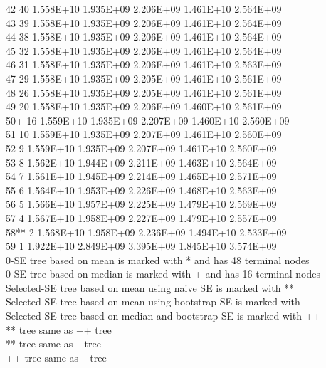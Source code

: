 \documentclass[12pt]{article}
\begin{document}
   42       40   1.558E+10   1.935E+09   2.206E+09   1.461E+10   2.564E+09\\
   43       39   1.558E+10   1.935E+09   2.206E+09   1.461E+10   2.564E+09\\
   44       38   1.558E+10   1.935E+09   2.206E+09   1.461E+10   2.564E+09\\
   45       32   1.558E+10   1.935E+09   2.206E+09   1.461E+10   2.564E+09\\
   46       31   1.558E+10   1.935E+09   2.206E+09   1.461E+10   2.563E+09\\
   47       29   1.558E+10   1.935E+09   2.205E+09   1.461E+10   2.561E+09\\
   48       26   1.558E+10   1.935E+09   2.205E+09   1.461E+10   2.561E+09\\
   49       20   1.558E+10   1.935E+09   2.206E+09   1.460E+10   2.561E+09\\
   50+      16   1.559E+10   1.935E+09   2.207E+09   1.460E+10   2.560E+09\\
   51       10   1.559E+10   1.935E+09   2.207E+09   1.461E+10   2.560E+09\\
   52        9   1.559E+10   1.935E+09   2.207E+09   1.461E+10   2.560E+09\\
   53        8   1.562E+10   1.944E+09   2.211E+09   1.463E+10   2.564E+09\\
   54        7   1.561E+10   1.945E+09   2.214E+09   1.465E+10   2.571E+09\\
   55        6   1.564E+10   1.953E+09   2.226E+09   1.468E+10   2.563E+09\\
   56        5   1.566E+10   1.957E+09   2.225E+09   1.479E+10   2.569E+09\\
   57        4   1.567E+10   1.958E+09   2.227E+09   1.479E+10   2.557E+09\\
   58**      2   1.568E+10   1.958E+09   2.236E+09   1.494E+10   2.533E+09\\
   59        1   1.922E+10   2.849E+09   3.395E+09   1.845E+10   3.574E+09\\

 0-SE tree based on mean is marked with * and has 48 terminal nodes\\
 0-SE tree based on median is marked with + and has 16 terminal nodes\\
 Selected-SE tree based on mean using naive SE is marked with **\\
 Selected-SE tree based on mean using bootstrap SE is marked with --\\
 Selected-SE tree based on median and bootstrap SE is marked with ++\\
 ** tree same as ++ tree\\
 ** tree same as -- tree\\
 ++ tree same as -- tree\\
\end{document}
